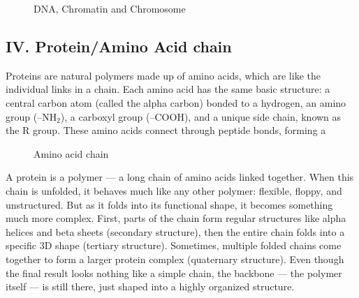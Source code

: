\documentclass[12pt]{article}
\begin{document}
\begin{flushleft}
\begin{figure}[!ht]
  \centering
  
  \caption{DNA, Chromatin and Chromosome\cite{byjus_chromatin}}
\end{figure}







\subsection*{IV. Protein/Amino Acid chain}
Proteins are natural polymers made up of amino acids, which are like the individual links in a chain. Each amino acid has the same basic structure: a central carbon atom (called the alpha carbon) bonded to a hydrogen, an amino group (–NH$_2$), a carboxyl group (–COOH), and a unique side chain, known as the R group. These amino acids connect through peptide bonds, forming a 

\begin{figure}[!ht]
  \centering
  
  \caption{Amino acid chain}
\end{figure}




A protein is a polymer — a long chain of amino acids linked together. When this chain is unfolded, it behaves much like any other polymer: flexible, floppy, and unstructured. But as it folds into its functional shape, it becomes something much more complex. First, parts of the chain form regular structures like alpha helices and beta sheets (secondary structure), then the entire chain folds into a specific 3D shape (tertiary structure). Sometimes, multiple folded chains come together to form a larger protein complex (quaternary structure). Even though the final result looks nothing like a simple chain, the backbone — the polymer itself — is still there, just shaped into a highly organized structure.


\end{flushleft}
\end{document}
